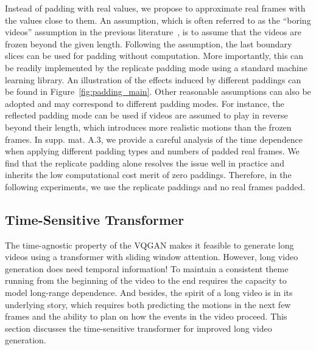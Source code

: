 Instead of padding with real values, we propose to approximate real frames with the values close to them. 
An assumption, which is often referred to as the ``boring videos'' assumption in the previous literature~\cite{carreira2017quo}, is to assume that the videos are frozen beyond the given length. 
Following the assumption, the last boundary slices can be used for padding without computation. 
More importantly, this can be readily implemented by the replicate padding mode using a standard machine learning library. 
An illustration of the effects induced by different paddings can be found in Figure~\ref{fig:padding_main}. 
Other reasonable assumptions can also be adopted and may correspond to different padding modes. 
For instance, the reflected padding mode can be used if videos are assumed to play in reverse beyond their length, which introduces more realistic motions than the frozen frames. 
In supp. mat. A.3, we provide a careful analysis of the time dependence when applying different padding types and numbers of padded real frames. 
We find that the replicate padding alone resolves the issue well in practice and inherits the low computational cost merit of zero paddings. 
Therefore, in the following experiments, we use the replicate paddings and no real frames padded. 

\subsection{Time-Sensitive Transformer}
The time-agnostic property of the VQGAN makes it feasible to generate long videos using a transformer with sliding window attention. 
However, long video generation does need temporal information! 
To maintain a consistent theme running from the beginning of the video to the end requires the capacity to model long-range dependence. 
And besides, the spirit of a long video is in its underlying story, which requires both predicting the motions in the next few frames and the ability to plan on how the events in the video proceed. 
This section discusses the time-sensitive transformer for improved long video generation.

